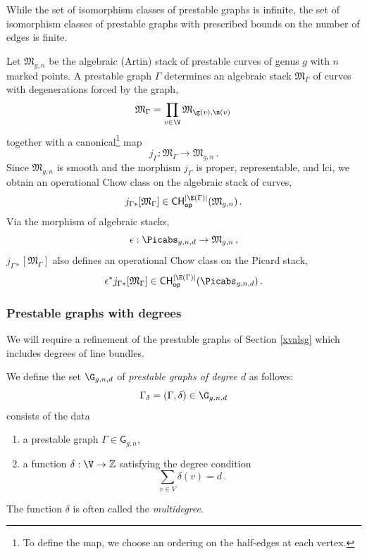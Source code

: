 While the set of isomorphism classes of prestable graphs is infinite, the set of isomorphism classes of prestable graphs with prescribed bounds on the number of edges is finite.



Let $\mathfrak{M}_{g,n}$ be the algebraic (Artin) stack of prestable curves of genus $g$ with $n$ marked points.
A prestable graph $\Gamma$ determines an algebraic stack $\mathfrak{M}_\Gamma$ of
curves
with degenerations forced by the graph,
$$
\mathfrak{M}_\Gamma = \prod_{v \in \V} \mathfrak{M}_{\g(v), \n(v)}\, $$
together with a
canonical\footnote{To define the map, we choose an ordering on the half-edges at each vertex. } map
$$j_\Gamma : \mathfrak{M}_\Gamma \to \mathfrak{M}_{g,n}\, .$$
Since $\mathfrak{M}_{g,n}$ is smooth and
the morphism $j_\Gamma$ is proper, representable, and lci, we obtain an operational Chow class on the algebraic
stack of curves,
$$j_{\Gamma*}[\mathfrak{M}_\Gamma] \in \mathsf{CH}_{\mathsf{op}}^{|\E(\Gamma)|}(\mathfrak{M}_{g,n})\, .$$
Via the morphism of algebraic stacks,
$$\epsilon: \Picabs_{g,n,d} \rightarrow \mathfrak{M}_{g,n}\, ,$$
$j_{\Gamma*}[\mathfrak{M}_\Gamma]$ also defines an operational Chow class
on the Picard stack,
$$\epsilon^* j_{\Gamma*}[\mathfrak{M}_\Gamma] \in \mathsf{CH}_{\mathsf{op}}^{|\E(\Gamma)|}(\Picabs_{g,n,d})\, .$$

\subsubsection{Prestable graphs with degrees} \label{Sect:Prestgrwdeg}
We will require a refinement of the prestable graphs of Section \ref{xvalsg} which includes degrees
of line bundles.

We define the set $\G_{g,n,d}$ of {\em prestable graphs of degree $d$} as
follows: $$\Gamma_\delta=(\Gamma,\delta) \in \G_{g,n,d}$$ consists of the data
\begin{enumerate}
    \item[$\bullet$] a prestable graph $\Gamma\in \mathsf{G}_{g,n}$,
    \item[$\bullet$] a function $\delta: \V \rightarrow \mathbb{Z}$
    satisfying the degree condition
$$\sum_{v\in V} \delta(v) = d\, .$$
\end{enumerate}
The function $\delta$ is  often called the {\em multidegree}.


